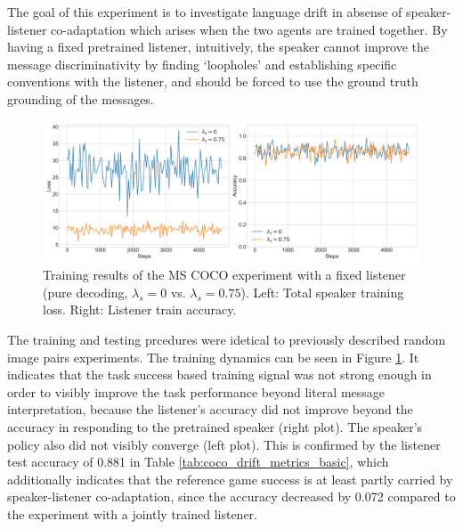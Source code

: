 The goal of this experiment is to investigate language drift in absense of speaker-listener co-adaptation which arises when the two agents are trained together. By having a fixed pretrained listener, intuitively, the speaker cannot improve the message discriminativity by finding `loopholes' and establishing specific conventions with the listener, and should be forced to use the ground truth grounding of the messages.

\begin{figure}
	\centering
	\includegraphics[width=\linewidth]{images/coco_fixedListener_baseline_random_0_075_losses.png}
	\caption{Training results of the MS COCO experiment with a fixed listener (pure decoding, $\lambda_s=0$ vs. $\lambda_s=0.75$). Left: Total speaker training loss. Right: Listener train accuracy.}
	\label{fig:coco_fixed_listener_speaker_loss_listener_acc_075}
\end{figure}

The training and testing prcedures were idetical to previously described random image pairs experiments. The training dynamics can be seen in Figure \ref{fig:coco_fixed_listener_speaker_loss_listener_acc_075}. It indicates that the task success based training signal was not strong enough in order to visibly improve the task performance beyond literal message interpretation, because the listener's accuracy did not improve beyond the accuracy in responding to the pretrained speaker (right plot). The speaker's policy also did not visibly converge (left plot). 
This is confirmed by the listener test accuracy of 0.881 in Table \ref{tab:coco_drift_metrics_basic}, which additionally indicates that the reference game success is at least partly carried by speaker-listener co-adaptation, since the accuracy decreased by 0.072 compared to the experiment with a jointly trained listener. 

